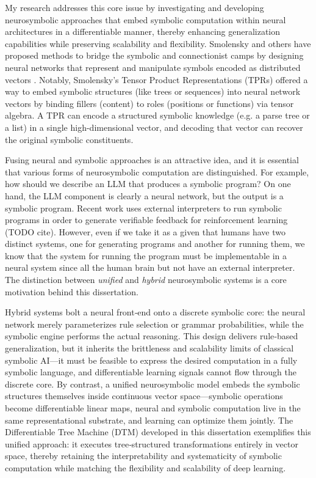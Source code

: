 My research addresses this core issue by investigating and developing neurosymbolic approaches that embed symbolic computation within neural architectures in a differentiable manner, thereby enhancing generalization capabilities while preserving scalability and flexibility. Smolensky and others have proposed methods to bridge the symbolic and connectionist camps by designing neural networks that represent and manipulate symbols encoded as distributed vectors \citep{Smolensky1990TensorPV,gayler2003vsa_jackendoff,plate,pollack_recursive_1990}. Notably, Smolensky’s Tensor Product Representations (TPRs) offered a way to embed symbolic structures (like trees or sequences) into neural network vectors by binding fillers (content) to roles (positions or functions) via tensor algebra. A TPR can encode a structured symbolic knowledge (e.g. a parse tree or a list) in a single high-dimensional vector, and decoding that vector can recover the original symbolic constituents.


Fusing neural and symbolic approaches is an attractive idea, and it is essential that various forms of neurosymbolic computation are distinguished. For example, how should we describe an LLM that produces a symbolic program? On one hand, the LLM component is clearly a neural network, but the output is a symbolic program. Recent work uses external interpreters to run symbolic programs in order to generate verifiable feedback for reinforcement learning (TODO cite). However, even if we take it as a given that humans have two distinct systems, one for generating programs and another for running them, we know that the system for running the program must be implementable in a neural system since all the human brain but not have an external interpreter. The distinction between \textit{unified} and \textit{hybrid} neurosymbolic systems is a core motivation behind this dissertation.

Hybrid systems bolt a neural front‑end onto a discrete symbolic core: the neural network merely parameterizes rule selection or grammar probabilities, while the symbolic engine performs the actual reasoning. This design delivers rule‑based generalization, but it inherits the brittleness and scalability limits of classical symbolic AI—it must be feasible to express the desired computation in a fully symbolic language, and differentiable learning signals cannot flow through the discrete core. By contrast, a unified neurosymbolic model embeds the symbolic structures themselves inside continuous vector space—symbolic operations become differentiable linear maps, neural and symbolic computation live in the same representational substrate, and learning can optimize them jointly. The Differentiable Tree Machine (DTM) developed in this dissertation exemplifies this unified approach: it executes tree‐structured transformations entirely in vector space, thereby retaining the interpretability and systematicity of symbolic computation while matching the flexibility and scalability of deep learning.

